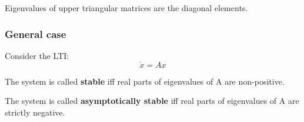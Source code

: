 \begin{tcolorbox}[colback=white]
    Eigenvalues of upper triangular matrices are the diagonal elements.
\end{tcolorbox}
    

\subsubsection{General case}

Consider the LTI:
\[\dot x = Ax\]

\begin{tcolorbox}[colback=green!10,colframe=green!50!black]
    The system is called \textbf{stable} iff real parts of eigenvalues of A are non-positive.
\end{tcolorbox}

\begin{tcolorbox}[colback=green!10,colframe=green!50!black]
    The system is called \textbf{asymptotically stable} iff real parts of eigenvalues of A are  strictly negative. 
\end{tcolorbox}